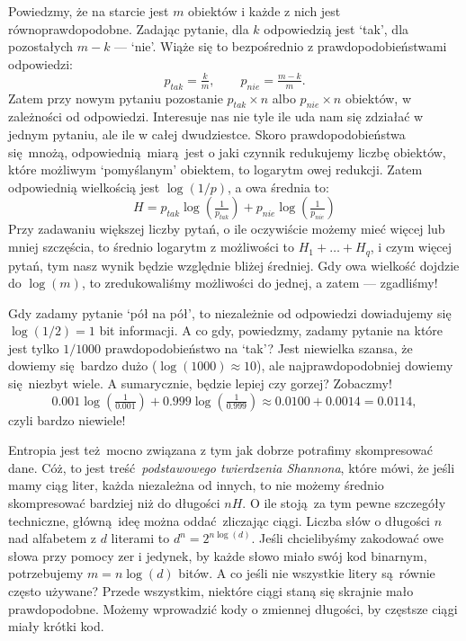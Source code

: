 \documentclass[10pt,a4paper]{article}
\begin{document}
Powiedzmy, że na starcie jest $m$ obiektów i każde z nich jest równoprawdopodobne.
Zadając pytanie, dla $k$ odpowiedzią jest `tak', dla pozostałych $m-k$ --- `nie'.
Wiąże się to bezpośrednio z prawdopodobieństwami odpowiedzi:
%
\begin{equation}
    p_{tak} = \tfrac{k}{m}, \qquad p_{nie} = \tfrac{m-k}{m}.
\end{equation}
%
Zatem przy nowym pytaniu pozostanie $p_{tak} \times n$ albo $p_{nie} \times n$ obiektów, w zależności od odpowiedzi.
Interesuje nas nie tyle ile uda nam się zdziałać w jednym pytaniu, ale ile w całej dwudziestce.
Skoro prawdopodobieństwa się mnożą, odpowiednią miarą jest o jaki czynnik redukujemy liczbę obiektów, które możliwym `pomyślanym' obiektem, to logarytm owej redukcji.
Zatem odpowiednią wielkością jest $\log(1/p)$, a owa średnia to:
%
\begin{equation}
    H = p_{tak} \log \left(\tfrac{1}{p_{tak}} \right) + p_{nie} \log \left(\tfrac{1}{p_{nie}} \right)
\end{equation}
%
Przy zadawaniu większej liczby pytań, o ile oczywiście możemy mieć więcej lub mniej szczęścia, to średnio logarytm z możliwości to $H_1 + \ldots + H_{q}$, i czym więcej pytań, tym nasz wynik będzie względnie bliżej średniej. 
Gdy owa wielkość dojdzie do $\log(m)$, to zredukowaliśmy możliwości do jednej, a zatem --- zgadliśmy!

Gdy zadamy pytanie `pół na pół', to niezależnie od odpowiedzi dowiadujemy się $\log(1/2)=1$ bit informacji.
A co gdy, powiedzmy, zadamy pytanie na które jest tylko $1/1000$ prawdopodobieństwo na `tak'?
Jest niewielka szansa, że dowiemy się bardzo dużo ($\log(1000)\approx 10$), ale najprawdopodobniej dowiemy się niezbyt wiele.
A sumarycznie, będzie lepiej czy gorzej? Zobaczmy!
%
\begin{equation}
    0.001 \log(\tfrac{1}{0.001}) + 0.999 \log(\tfrac{1}{0.999})\approx 0.0100 + 0.0014 = 0.0114,
\end{equation}
%
czyli bardzo niewiele!

Entropia jest też mocno związana z tym jak dobrze potrafimy skompresować dane.
Cóż, to jest treść \emph{podstawowego twierdzenia Shannona}, które mówi, że jeśli mamy ciąg liter,
każda niezależna od innych, to nie możemy średnio skompresować bardziej niż do długości $n H$.
O ile stoją za tym pewne szczegóły techniczne, główną ideę można oddać zliczając ciągi.
Liczba słów o długości $n$ nad alfabetem z $d$ literami to $d^n=2^{n \log(d)}$.
Jeśli chcielibyśmy zakodować owe słowa przy pomocy zer i jedynek,
by każde słowo miało swój kod binarnym, potrzebujemy $m = n \log(d)$ bitów.
A co jeśli nie wszystkie litery są równie często używane?
Przede wszystkim, niektóre ciągi staną się skrajnie mało prawdopodobne.
Możemy wprowadzić kody o zmiennej długości, by częstsze ciągi miały krótki kod.
\end{document}
